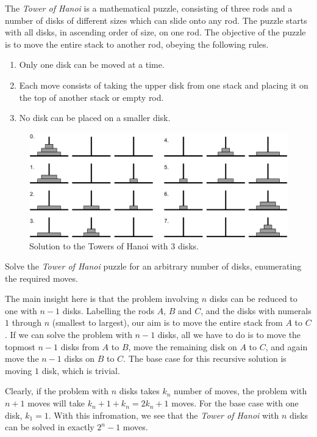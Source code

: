 

\problem The \textit{Tower of Hanoi} is a mathematical puzzle, consisting of three rods and a number of disks of different sizes which
can slide onto any rod. The puzzle starts with all disks, in ascending order of size, on one rod. The objective of the puzzle is to
move the entire stack to another rod, obeying the following rules.
\begin{enumerate}
	\item Only one disk can be moved at a time.
	\item Each move consists of taking the upper disk from one stack and placing it on the top of another stack or empty rod.
	\item No disk can be placed on a smaller disk.
\end{enumerate}
\begin{figure}[h]
	\begin{center}
		\includegraphics[scale=0.7]{hanoi.png}
	\end{center}
	\caption*{Solution to the Towers of Hanoi with 3 disks.}
	\label{fig:hanoi_solved}
\end{figure}

Solve the \textit{Tower of Hanoi} puzzle for an arbitrary number of disks, enumerating the required moves.

\solution The main insight here is that the problem involving $n$ disks can be reduced to one with $n - 1$ disks.
Labelling the rods $A$, $B$ and $C$, and the disks with numerals $1$ through $n$ (smallest to largest), our aim is to move the
entire stack from $A$ to $C$. If we can solve the problem with $n - 1$ disks, all we have to do is to move the topmost $n - 1$ disks
from $A$ to $B$, move the remaining disk on $A$ to $C$, and again move the $n - 1$ disks on $B$ to $C$. The base case for this
recursive solution is moving $1$ disk, which is trivial.

Clearly, if the problem with $n$ disks takes $k_n$ number of moves, the problem with $n + 1$ moves will take $k_n + 1 + k_n = 2k_n + 1$ moves.
For the base case with one disk, $k_1 = 1$. With this infromation, we see that the \textit{Tower of Hanoi} with $n$ disks can be solved
in exactly $2^n - 1$ moves.

